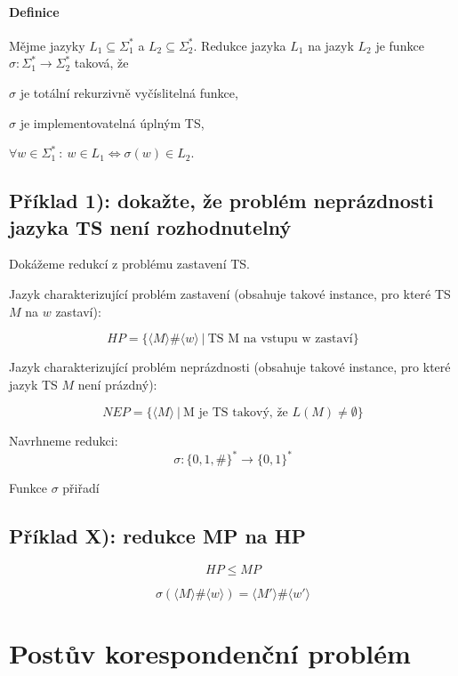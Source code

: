 \paragraph*{Definice} Mějme jazyky $L_1 \subseteq \Sigma_1^*$ a $L_2 \subseteq \Sigma_2^*$. Redukce jazyka $L_1$ na jazyk $L_2$ je funkce $\sigma : \Sigma_1^* \rightarrow \Sigma_2^*$ taková, že \begin{compactitem}
    \item $\sigma$ je totální rekurzivně vyčíslitelná funkce,
    \item $\sigma$ je implementovatelná úplným TS,
    \item $\forall w \in \Sigma_1^* ~:~ w \in L_1 \Leftrightarrow \sigma(w) \in L_2$.
\end{compactitem}

\subsection*{Příklad 1): dokažte, že problém neprázdnosti jazyka TS není rozhodnutelný}

\begin{compactitem}
    \item Dokážeme redukcí z problému zastavení TS.

    \item Jazyk charakterizující problém zastavení (obsahuje takové instance, pro které TS $M$ na $w$ zastaví):

    $$ HP = \{ \langle M \rangle \# \langle w \rangle ~|~ \text{TS M na vstupu w zastaví} \} $$

    \item Jazyk charakterizující problém neprázdnosti (obsahuje takové instance, pro které jazyk TS $M$ není prázdný):

    $$ NEP = \{ \langle M \rangle ~|~ \text{M je TS takový, že } L(M) \not= \emptyset \} $$

    \item Navrhneme redukci: $$\sigma : \{ 0, 1, \# \}^* \rightarrow \{ 0, 1 \}^*$$

    \item Funkce $\sigma$ přiřadí

\end{compactitem}



\subsection*{Příklad X): redukce MP na HP}

$$ HP \leq MP $$

$$ \sigma(\langle M \rangle \# \langle w \rangle) = \langle M' \rangle \# \langle w' \rangle$$


\section{Postův korespondenční problém}

